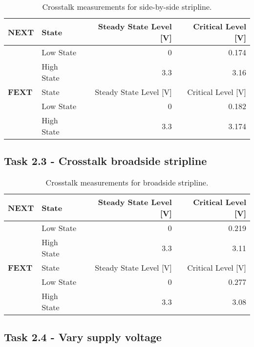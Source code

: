 \documentclass[../main.tex]{subfiles}
\begin{document}
\begin{table}[h]
    \centering
    \begin{tabular}{l l|r r}
        \toprule[1pt]
        \textbf{NEXT} & State & Steady State Level [V] & Critical Level [V] \\
        \midrule
        & Low State & 0 & 0.174 \\
        & High State & 3.3 & 3.16 \\
        \midrule[1pt]
        \textbf{FEXT} & State & Steady State Level [V] & Critical Level [V] \\
        \midrule
        & Low State & 0 & 0.182 \\
        & High State & 3.3 & 3.174 \\
        \bottomrule[1pt]
    \end{tabular}
    \caption{Crosstalk measurements for side-by-side stripline.}
    \label{tab:meas-side-by-side-stripline}
\end{table}

\newpage

\subsection{Task 2.3 - Crosstalk broadside stripline}

\begin{table}[h]
    \centering
    \begin{tabular}{l l|r r}
        \toprule[1pt]
        \textbf{NEXT} & State & Steady State Level [V] & Critical Level [V] \\
        \midrule
        & Low State & 0 & 0.219 \\
        & High State & 3.3 & 3.11 \\
        \midrule[1pt]
        \textbf{FEXT} & State & Steady State Level [V] & Critical Level [V] \\
        \midrule
        & Low State & 0 & 0.277 \\
        & High State & 3.3 & 3.08 \\
        \bottomrule[1pt]
    \end{tabular}
    \caption{Crosstalk measurements for broadside stripline.}
    \label{tab:meas-broadside-stripline}
\end{table}

\subsection{Task 2.4 - Vary supply voltage}
\end{document}
